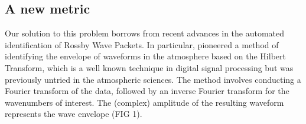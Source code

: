 \subsection{A new metric}

Our solution to this problem borrows from recent advances in the automated identification of Rossby Wave Packets. In particular, \citet{Zimin2003} pioneered a method of identifying the envelope of waveforms in the atmosphere based on the Hilbert Transform, which is a well known technique in digital signal processing but was previously untried in the atmospheric sciences. The method involves conducting a Fourier transform of the data, followed by an inverse Fourier transform for the wavenumbers of interest. The (complex) amplitude of the resulting waveform represents the wave envelope (FIG 1).  